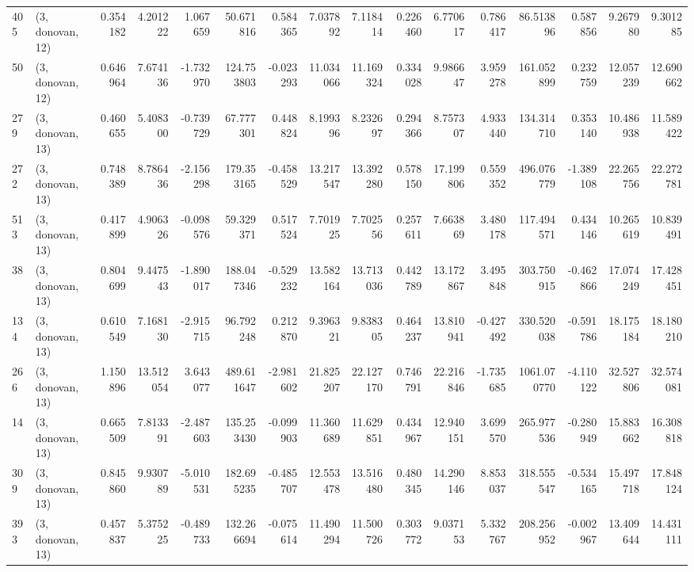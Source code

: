\begin{tabular}{llrrrrrrrrrrrrrr}
405 &  (3, donovan, 12) &   0.354182 &   4.201222 &   1.067659 &    50.671816 &   0.584365 &   7.037892 &   7.118414 &  0.226460 &   6.770617 &   0.786417 &     86.513896 &   0.587856 &    9.267980 &    9.301285 \\
50  &  (3, donovan, 12) &   0.646964 &   7.674136 &  -1.732970 &   124.753803 &  -0.023293 &  11.034066 &  11.169324 &  0.334028 &   9.986647 &   3.959278 &    161.052899 &   0.232759 &   12.057239 &   12.690662 \\
279 &  (3, donovan, 13) &   0.460655 &   5.408300 &  -0.739729 &    67.777301 &   0.448824 &   8.199396 &   8.232697 &  0.294366 &   8.757307 &   4.933440 &    134.314710 &   0.353140 &   10.486938 &   11.589422 \\
272 &  (3, donovan, 13) &   0.748389 &   8.786436 &  -2.156298 &   179.353165 &  -0.458529 &  13.217547 &  13.392280 &  0.578150 &  17.199806 &   0.559352 &    496.076779 &  -1.389108 &   22.265756 &   22.272781 \\
513 &  (3, donovan, 13) &   0.417899 &   4.906326 &  -0.098576 &    59.329371 &   0.517524 &   7.701925 &   7.702556 &  0.257611 &   7.663869 &   3.480178 &    117.494571 &   0.434146 &   10.265619 &   10.839491 \\
38  &  (3, donovan, 13) &   0.804699 &   9.447543 &  -1.890017 &   188.047346 &  -0.529232 &  13.582164 &  13.713036 &  0.442789 &  13.172867 &   3.495848 &    303.750915 &  -0.462866 &   17.074249 &   17.428451 \\
134 &  (3, donovan, 13) &   0.610549 &   7.168130 &  -2.915715 &    96.792248 &   0.212870 &   9.396321 &   9.838305 &  0.464237 &  13.810941 &  -0.427492 &    330.520038 &  -0.591786 &   18.175184 &   18.180210 \\
266 &  (3, donovan, 13) &   1.150896 &  13.512054 &   3.643077 &   489.611647 &  -2.981602 &  21.825207 &  22.127170 &  0.746791 &  22.216846 &  -1.735685 &   1061.070770 &  -4.110122 &   32.527806 &   32.574081 \\
14  &  (3, donovan, 13) &   0.665509 &   7.813391 &  -2.487603 &   135.253430 &  -0.099903 &  11.360689 &  11.629851 &  0.434967 &  12.940151 &   3.699570 &    265.977536 &  -0.280949 &   15.883662 &   16.308818 \\
309 &  (3, donovan, 13) &   0.845860 &   9.930789 &  -5.010531 &   182.695235 &  -0.485707 &  12.553478 &  13.516480 &  0.480345 &  14.290146 &   8.853037 &    318.555547 &  -0.534165 &   15.497718 &   17.848124 \\
393 &  (3, donovan, 13) &   0.457837 &   5.375225 &  -0.489733 &   132.266694 &  -0.075614 &  11.490294 &  11.500726 &  0.303772 &   9.037153 &   5.332767 &    208.256952 &  -0.002967 &   13.409644 &   14.431111 \\

\end{tabular}
